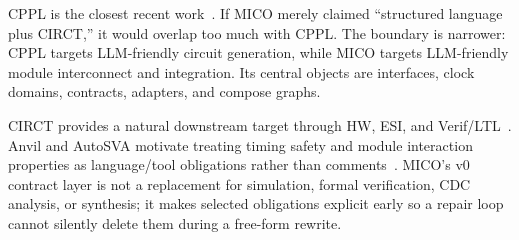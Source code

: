 CPPL is the closest recent work~\cite{cppl2026}. If MICO merely claimed ``structured language plus CIRCT,'' it would overlap too much with CPPL. The boundary is narrower: CPPL targets LLM-friendly circuit generation, while MICO targets LLM-friendly module interconnect and integration. Its central objects are interfaces, clock domains, contracts, adapters, and compose graphs.

CIRCT provides a natural downstream target through HW, ESI, and Verif/LTL~\cite{circt_hw,circt_esi}. Anvil and AutoSVA motivate treating timing safety and module interaction properties as language/tool obligations rather than comments~\cite{anvil2025,autosva2021}. MICO's v0 contract layer is not a replacement for simulation, formal verification, CDC analysis, or synthesis; it makes selected obligations explicit early so a repair loop cannot silently delete them during a free-form rewrite.

